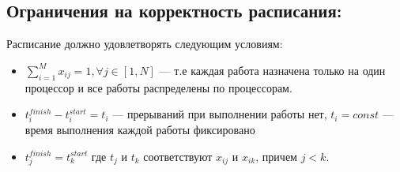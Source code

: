\documentclass[openany, twoside, a4paper, 12pt]{extbook}
\begin{document}
	\subsection*{Ограничения на корректность расписания:}
	
	Расписание должно удовлетворять следующим условиям:
	\begin{itemize}
	    \item $\sum_{i = 1}^{M} x_{ij} = 1, \forall j \in [1, N]$ --- т.е каждая работа назначена только на один процессор и все работы распределены по процессорам.
	    \item $t_i^{finish} - t^{start}_i = t_i$ --- прерываний при выполнении работы нет, $t_{i} = const$ --- время выполнения каждой работы фиксировано
        \item $t_j^{finish} = t^{start}_{k}$ где $t_j$ и $t_k$ соответствуют $x_{ij}$ и $x_{ik}$, причем $j < k$.
	\end{itemize}
\end{document}
